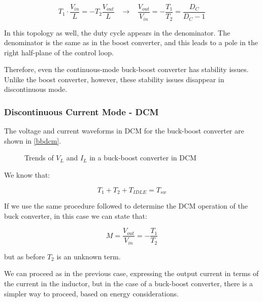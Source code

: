 \documentclass[../main.tex]{subfiles}
\begin{document}
\begin{equation}
	T_1 \cdot \frac{V_{in}}{L} = -T_2 \frac{V_{out}}{L} \hspace{10pt} \longrightarrow \hspace{10pt} \frac{V_{out}}{V_{in}} = - \frac{T_1}{T_2} = \frac{D_C}{D_C - 1}
\end{equation}

In this topology as well, the duty cycle appears in the denominator. The denominator is the same as in the boost converter, and this leads to a pole in the right half-plane of the control loop. 

Therefore, even the continuous-mode buck-boost converter has stability issues. Unlike the boost converter, however, these stability issues disappear in discontinuous mode.

\subsubsection*{Discontinuous Current Mode - DCM}


The voltage and current waveforms in DCM for the buck-boost converter are shown in \autoref{bbdcm}.

\begin{figure}[h!]
\begin{center}


\label{bbdcm}
\caption{Trends of $V_L$ and $I_L$ in a buck-boost converter in DCM}	
\end{center}
\end{figure}


We know that:

\begin{equation}
	T_1 + T_2 + T_{IDLE} = T_{sw}
\end{equation}

If we use the same procedure followed to determine the DCM operation of the buck converter, in this case we can state that:

\begin{equation}
	M = \frac{V_{out}}{V_{in}} = - \frac{T_1}{T_2}
\end{equation}

but as before $T_2$ is an unknown term. 

We can proceed as in the previous case, expressing the output current in terms of the current in the inductor, but in the case of a buck-boost converter, there is a simpler way to proceed, based on energy considerations.\\
\end{document}
